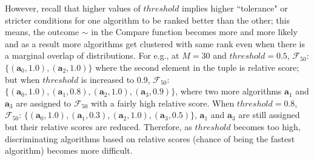 \documentclass[conference]{IEEEtran}
\begin{document}
 However, recall that higher values of $threshold$ implies higher ``tolerance" or stricter conditions for one algorithm to be ranked better than the other; this means, the outcome $\sim$ in the Compare function becomes more and more likely and as a result more algorithms get clustered with same rank even when there is a marginal overlap of distributions. For e.g., at $M=30$ and $threshold=0.5$,  $\mathcal{F}_{50}$: $\{(\mathbf{a}_0,1.0),(\mathbf{a}_2,1.0)\}$ where the second element in the tuple is relative score; but when $threshold$ is increased to 0.9, $\mathcal{F}_{50}$: $\{(\mathbf{a}_0,1.0),(\mathbf{a}_1,0.8), (\mathbf{a}_2,1.0), (\mathbf{a}_3,0.9)\}$, where two more  algorithms $\mathbf{a}_1$ and $\mathbf{a}_3$ are assigned to $\mathcal{F}_{50}$ with a fairly high relative score. When $threshold = 0.8$, $\mathcal{F}_{50}$: $\{(\mathbf{a}_0,1.0),(\mathbf{a}_1,0.3), (\mathbf{a}_2,1.0), (\mathbf{a}_3,0.5)\}$, $\mathbf{a}_1$ and $\mathbf{a}_3$ are still assigned but their relative scores are reduced. Therefore, as $threshold$ becomes too high, discriminating algorithms based on relative scores (chance of being the fastest algorithm) becomes more difficult.
 
\end{document}
